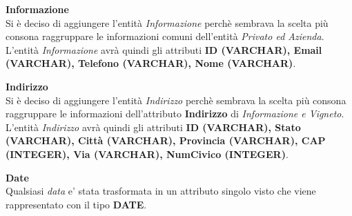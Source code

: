 \textbf{\large{Informazione}}\\
Si è deciso di aggiungere l'entità \emph{Informazione} perchè sembrava la scelta più consona raggruppare le informazioni comuni dell'entità \emph{Privato ed Azienda}. L'entità \emph{Informazione} avrà quindi gli attributi \textbf{ID (VARCHAR), Email (VARCHAR), Telefono (VARCHAR), Nome (VARCHAR)}.

\begin{flushleft}
\textbf{\large{Indirizzo}}\\
Si è deciso di aggiungere l'entità \emph{Indirizzo} perchè sembrava la scelta più consona raggruppare le informazioni dell'attributo \textbf{Indirizzo} di \emph{Informazione e Vigneto}. L'entità \emph{Indirizzo} avrà quindi gli attributi \textbf{ID (VARCHAR), Stato (VARCHAR), Città (VARCHAR), Provincia (VARCHAR), CAP (INTEGER), Via (VARCHAR), NumCivico (INTEGER)}.
\end{flushleft}

\begin{flushleft}
\textbf{\large{Date}}\\
Qualsiasi \emph{data} e' stata trasformata in un attributo singolo visto che viene rappresentato con il tipo \textbf{DATE}.
\end{flushleft}
